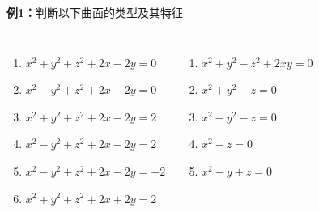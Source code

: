 \begin{frame}[<+->]
	\linespread{1.2}
	\begin{exampleblock}{{\bf 例1：}判断以下曲面的类型及其特征\hfill}
		\begin{columns}[t]
				\begin{enumerate}
				  \item $x^2+y^2+z^2+2x-2y=0$
				  \item $x^2-y^2+z^2+2x-2y=0$
				  \item $x^2+y^2+z^2+2x-2y=2$
				  \item $x^2-y^2+z^2+2x-2y=2$
				  \item $x^2-y^2+z^2+2x-2y=-2$
				  \item $x^2+y^2+z^2+2x+2y=2$
				\end{enumerate}
				\begin{enumerate}
				  \addtocounter{enumi}{6}
				  \item $x^2+y^2-z^2+2xy=0$
				  \item $x^2+y^2-z=0$
				  \item $x^2-y^2-z=0$
				  \item $x^2-z=0$
				  \item $x^2-y+z=0$
				\end{enumerate}
		\end{columns}
	\end{exampleblock}
\end{frame}

